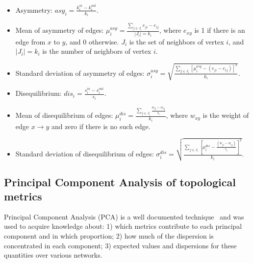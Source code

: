 \documentclass[%
	aip,
	jmp,%
	amsmath,amssymb,
	reprint,%
]{revtex4-1}
\begin{document}
\begin{itemize}
	\item Asymmetry: $asy_i=\frac{k_i^{in}-k_i^{out}}{k_i}$.
	\item Mean of asymmetry of edges: $\mu_i^{asy}=\frac{\sum_{j\in J_i} e_{ji}-e_{ij}}{|J_i|=k_i}$, where $e_{xy}$ is 1 if there is an edge from $x$ to $y$, and $0$ otherwise. $J_i$ is the set of neighbors of vertex $i$, and $|J_i|=k_i$ is the number of neighbors of vertex $i$.
	\item Standard deviation of asymmetry of edges: $\sigma_i^{asy}=\sqrt{\frac{\sum_{j\in J_i}[\mu^{asy}_i -(e_{ji}-e_{ij}) ]^2  }{k_i}  }$.
	\item Disequilibrium: $dis_i=\frac{s_i^{in}-s_i^{out}}{s_i}$.
	\item Mean of disequilibrium of edges: $\mu_i^{dis}=\frac{\sum_{j \in J_i}\frac{w_{ji}-w_{ij}}{s_i}}{k_i}$, where $w_{xy}$ is the weight of edge $x\rightarrow y$ and zero if there is no such edge.
	\item Standard deviation of disequilibrium of edges: $\sigma_i^{dis}=\sqrt{\frac{\sum_{j\in J_i}[\mu^{dis}_i-\frac{(w_{ji}-w_{ij})}{s_i}]^2}{k_i}}$.
\end{itemize}

\subsection{Principal Component Analysis of topological metrics}\label{sec:pca}
Principal Component Analysis (PCA) is a well documented technique~\cite{pca} and was used to acquire knowledge about:
1) which metrics contribute to each principal component and in which proportion; 2) how much of the dispersion is concentrated in each component; 3) expected values and dispersions for these quantities over various networks.
\end{document}
